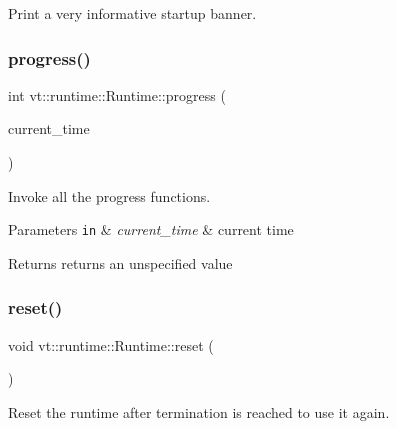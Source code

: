 Print a very informative startup banner. 

\mbox{\label{structvt_1_1runtime_1_1_runtime_a731e9f4a4fd6e21b067cbdc4ada11f03}} 
\subsubsection{\texorpdfstring{progress()}{progress()}}
{\footnotesize\ttfamily int vt\+::runtime\+::\+Runtime\+::progress (\begin{DoxyParamCaption}\item[{\hyperlink{namespacevt_a876a9d0cd5a952859c72de8a46881442}{Time\+Type}}]{current\+\_\+time }\end{DoxyParamCaption})\hspace{0.3cm}{\ttfamily [inline]}}



Invoke all the progress functions. 


\begin{DoxyParams}[1]{Parameters}
\mbox{\tt in}  & {\em current\+\_\+time} & current time\\
\hline
\end{DoxyParams}
\begin{DoxyReturn}{Returns}
returns an unspecified value 
\end{DoxyReturn}
\mbox{\label{structvt_1_1runtime_1_1_runtime_ad7afc3a8dbe8887c914ba24418455d62}} 
\subsubsection{\texorpdfstring{reset()}{reset()}}
{\footnotesize\ttfamily void vt\+::runtime\+::\+Runtime\+::reset (\begin{DoxyParamCaption}{ }\end{DoxyParamCaption})}



Reset the runtime after termination is reached to use it again. 

\mbox{\label{structvt_1_1runtime_1_1_runtime_a1c4fda11afb43bb2607cd1f00686550c}} 
